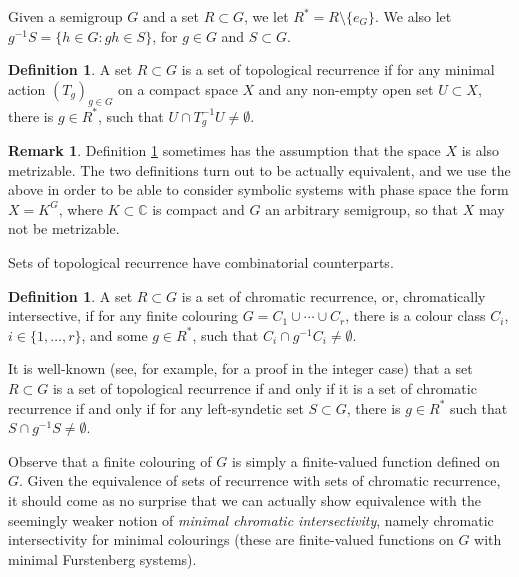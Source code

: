 \documentclass{amsart}
\numberwithin{equation}{section}
\theoremstyle{definition}
\newtheorem{definition}[lemma]{Definition}
\newtheorem*{remark*}{Remark}
\theoremstyle{plain}
\newcommand{\C}{{\mathbb C}}
\begin{document}
Given a semigroup $G$ and a set $R\subset G$, we let $R^{*}=R\setminus \{e_G\}$. We also let $g^{-1}S=\{h\in G: gh\in S\}$, for $g\in G$ and $S\subset G$.

\begin{definition}\label{sets of recurrence}
A set $R\subset G$ is a set of topological recurrence if for any 
minimal action $(T_g)_{g\in G}$ on a compact space $X$ and any 
non-empty open set $U\subset X$, there is $g\in R^{*}$, such that 
$U\cap T_g^{-1}U\neq \emptyset$.     
\end{definition}

\begin{remark*}
Definition \ref{sets of recurrence} sometimes has the 
assumption that the space $X$ is also metrizable. The two 
definitions turn 
out to be actually equivalent, and we use the above in 
order to 
be able to consider symbolic systems with phase space the 
form 
$X=K^G$, where $K\subset\C$ is compact and $G$ an 
arbitrary 
semigroup, so that $X$ may not be metrizable.
\end{remark*}

Sets of topological recurrence have combinatorial counterparts.

\begin{definition}
A set $R\subset G$ is a set of chromatic recurrence, or, chromatically intersective, if for any 
finite colouring $G=C_1\cup \cdots \cup C_r$, there is a colour 
class $C_i$, $i\in \{1,\ldots,r\}$, and some $g\in R^{*}$, such 
that $C_i \cap g^{-1}C_i \neq \emptyset$.    
\end{definition}

It is well-known (see, for example, \cite{McCutcheon} for 
a proof in the integer case) that a 
set $R\subset G$ is a set of topological recurrence if 
and only if it is a set of chromatic recurrence if and 
only if for any
left-syndetic set $S\subset G$, there is $g\in R^{*}$ 
such that 
$S\cap g^{-1}S \neq \emptyset$. 

Observe that a finite colouring 
of $G$ is simply a finite-valued function defined on $G$. Given
the equivalence of sets of recurrence with sets of chromatic 
recurrence, it should come as no surprise that we can actually 
show equivalence with the seemingly weaker notion of \textit{{minimal chromatic 
intersectivity}}, namely chromatic intersectivity for minimal colourings (these are finite-valued functions on $G$ with minimal Furstenberg systems).
\end{document}
